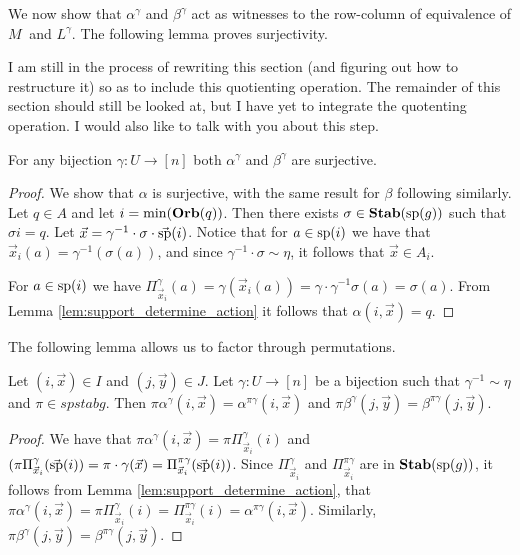 \documentclass[../paper.tex]{subfiles}
\begin{document}
We now show that $\alpha^{\gamma}$ and $\beta^{\gamma}$ act as witnesses to the
row-column of equivalence of $M_{~}$ and $L^{\gamma}$. The following lemma
proves surjectivity.

\begin{remark}
  I am still in the process of rewriting this section (and figuring out how to
  restructure it) so as to include this quotienting operation. The remainder of
  this section should still be looked at, but I have yet to integrate the
  quotenting operation. I would also like to talk with you about this step.
\end{remark}

\begin{lem} 
  For any bijection $\gamma : U \rightarrow [n]$ both $\alpha^{\gamma}$ and
  $\beta^{\gamma}$ are surjective.
  \label{lem:alpha-beta-surjective}
\end{lem}
\begin{proof}
  We show that $\alpha$ is surjective, with the same result for $\beta$
  following similarly. Let $q \in A$ and let $i = \min (\text{\textbf{Orb}} (q))$. Then there
  exists $\sigma \in \text{\textbf{Stab}} (\text{sp} (g))$ such that $\sigma i = q$. Let $\vec{x} =
  \gamma^{-1} \cdot \sigma \cdot \vec{\text{sp}}(i)$. Notice that for $a \in
  \text{sp}(i)$ we have that $\vec{x}_i(a) = \gamma^{-1} (\sigma (a))$, and since
  $\gamma^{-1} \cdot \sigma \sim \eta$, it follows that $\vec{x} \in A_i$.

  For $a \in \text{sp}(i)$ we have $\Pi^{\gamma}_{\vec{x}_i} (a) = \gamma
  (\vec{x}_i(a)) = \gamma \cdot \gamma^{-1} \sigma (a) = \sigma (a)$. From Lemma
  \ref{lem:support_determine_action} it follows that $\alpha(i, \vec{x}) = q$.
\end{proof}

The following lemma allows us to factor through permutations.
\begin{lem}
  \label{lem:alpha_and_gamma}
  Let $(i,\vec{x}) \in I$ and $(j, \vec{y}) \in J$. Let $\gamma: U \rightarrow
  [n]$ be a bijection such that $\gamma^{-1} \sim \eta$ and $\pi \in spstab{g}$.
  Then $\pi \alpha^{\gamma}(i, \vec{x}) = \alpha^{\pi \gamma}(i, \vec{x})$ and
  $\pi \beta^{\gamma}(j, \vec{y}) = \beta^{\pi \gamma}(j, \vec{y})$.
\end{lem}
\begin{proof}
  We have that $\pi \alpha^{\gamma}(i, \vec{x}) = \pi
  \Pi^{\gamma}_{\vec{x}_i}(i)$ and $(\pi
  \Pi^{\gamma}_{\vec{x}_{i}}(\vec{\text{sp}}(i)) = \pi \cdot \gamma (\vec{x}) =
  \Pi^{\pi \gamma}_{\vec{x}_i}(\vec{\text{sp}}(i))$. Since
  $\Pi^{\gamma}_{\vec{x}_i}$ and $\Pi^{\pi \gamma}_{\vec{x}_i}$ are in
  $\text{\textbf{Stab}} (\text{sp} (g))$, it follows from Lemma \ref{lem:support_determine_action}, that
  $\pi \alpha^{\gamma}(i, \vec{x}) = \pi \Pi^{\gamma}_{\vec{x}_i} (i) = \Pi^{\pi
    \gamma}_{\vec{x}_i}(i) = \alpha^{\pi \gamma}(i, \vec{x})$. Similarly, $\pi
  \beta^{\gamma}(j, \vec{y}) = \beta^{\pi \gamma} (j, \vec{y})$.
\end{proof}
\end{document}
